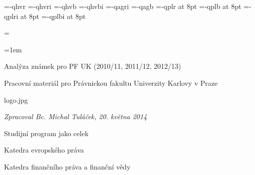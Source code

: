
\chyph



\ifx\font\corkencoded {}\else{}\fi
\font\tenss   =\tmp-qhvr  \sizespec
\font\tenssi  =\tmp-qhvri \sizespec
\font\tenssb  =\tmp-qhvb  \sizespec
\font\tenssbi =\tmp-qhvbi \sizespec
\regfont\tenss \regfont\tenssi \regfont\tenssb \regfont\tenssbi
\regfont\tenbfc
\def\ss{\tenss\thefontscale[900]} \def\ssi{\tenssi\thefontscale[900]}
\def\tt{\tentt\thefontscale[1050]}
\font\citatrm=\tmp-qagri \sizespec
\font\thumbbf=\tmp-qagb \sizespec
\font\male=\tmp-qplr at 8pt
\font\malebf=\tmp-qplb at 8pt
\font\maleit=\tmp-qplri at 8pt
\font\malebi=\tmp-qplbi at 8pt

\def\crx{\crcr\noalign{\penalty10000\hrule\penalty1000\kern-.4pt\hrule\penalty10000}}

\newdimen\Pwidth
\newdimen\Qwidth
\def\tabdeclareP {\tabiteml\vtop{\hsize=\Pwidth \leftskip=0pt \rightskip=0pt plus1fil \parindent=0pt
   \baselineskip=1.2em \lineskiplimit=0pt \noindent ##\tabstrutA}\hss\tabitemr}
\def\tabdeclareQ {\tabiteml\vtop{\hsize=\Qwidth \leftskip=0pt plus 1fil \rightskip=0pt plus 1fil \parindent=0pt
   \baselineskip=1.2em \lineskiplimit=0pt \noindent ##\tabstrutA}\tabitemr}
\Pwidth=2.5cm
\Qwidth=1cm
\newtoks\headname \headname={}

\emergencystretch=1em

\hyperlinks{\Blue}{\Green}

\vfil
\tit Analýza známek pro PF UK (2010/11, 2011/12, 2012/13)

\vfil

\tit Pracovní materiál pro Právnickou fakultu Univerzity Karlovy v Praze

\vfil

\hsize \centerline{\inspic logo.jpg }
\vfil
\hfill {\em Zpracoval Bc. Michal Tuláček, 20. května 2014}
\eject


\vfill\eject
\maketoc

\vfill\eject

\sec Studijní program jako celek



\vfill\eject

\sec Katedra evropského práva



\vfill\eject

\sec Katedra finančního práva a finanční vědy




